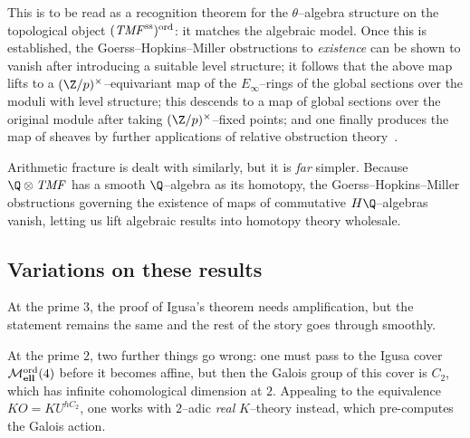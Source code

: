 \noindent This is to be read as a recognition theorem for the \(\theta\)--algebra structure on the topological object \((\mathit{TMF}^{\mathrm{ss}})^{\mathrm{ord}}\): it matches the algebraic model.  Once this is established, the Goerss--Hopkins--Miller obstructions to \emph{existence} can be shown to vanish after introducing a suitable level structure; it follows that the above map lifts to a \((\Z/p)^{\times}\)--equivariant map of the \(E_\infty\)--rings of the global sections over the moduli with level structure; this descends to a map of global sections over the original module after taking \((\Z/p)^\times\)--fixed points; and one finally produces the map of sheaves by further applications of relative obstruction theory~\cite[Section 8, Step 2]{BehrensConstruction}.

\begin{remark}
Arithmetic fracture is dealt with similarly, but it is \emph{far} simpler.  Because \(\Q \otimes \TMF\) has a smooth \(\Q\)--algebra as its homotopy, the Goerss--Hopkins--Miller obstructions governing the existence of maps of commutative \(H\Q\)--algebras vanish, letting us lift algebraic results into homotopy theory wholesale.
\end{remark}






\subsection*{Variations on these results}

\begin{remark}
At the prime \(3\), the proof of Igusa's theorem needs amplification, but the statement remains the same and the rest of the story goes through smoothly.
\end{remark}

\begin{remark}
At the prime \(2\), two further things go wrong: one must pass to the Igusa cover \(\mathcal{M}_{\mathbf{ell}}^{\mathrm{ord}}(4)\) before it becomes affine, but then the Galois group of this cover is \(C_2\), which has infinite cohomological dimension at \(2\).  Appealing to the equivalence \(KO = KU^{hC_2}\), one works with \(2\)--adic \emph{real} \(K\)--theory instead, which pre-computes the Galois action.
\end{remark}

